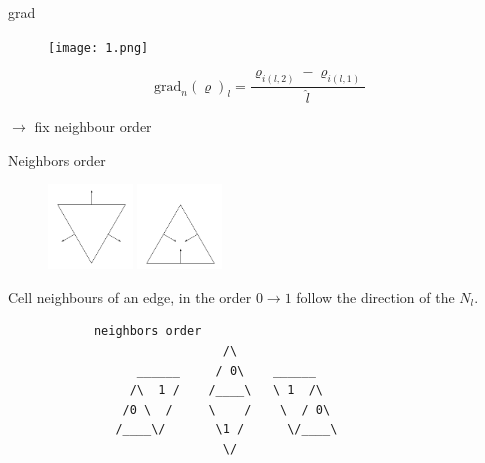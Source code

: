 \documentclass{beamer}
\begin{document}
\begin{frame}{grad}
  \begin{figure}[htbp]
  \centering
  \texttt{[image: 1.png]}
  \end{figure}
  \[\text{grad}_n(\varrho)_l = \frac{\varrho_{i(l,2)}-\varrho_{i(l,1)}}{\hat{l}}\]

  $\rightarrow$ fix neighbour order
\end{frame}

\begin{frame}[fragile]{Neighbors order}
  \begin{figure}[htbp]
  \centering
  \includegraphics[width=0.2\textwidth]{flow_downward.pdf}
  \includegraphics[width=0.2\textwidth]{flow_upward.pdf}
  \end{figure}

  Cell neighbours of an edge, in the order $0 \rightarrow 1$ follow the direction of the $N_l$.
  \begin{lstlisting}
            neighbors order
                              /\
                  ______     / 0\    ______
                 /\  1 /    /____\   \ 1  /\
                /0 \  /     \    /    \  / 0\
               /____\/       \1 /      \/____\
                              \/
  \end{lstlisting}
\end{frame}
\end{document}
